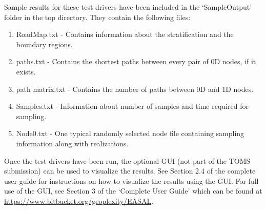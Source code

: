 \documentclass[10pt]{article}
\begin{document}
Sample results for these test drivers have been included in the `SampleOutput'
folder in the top directory.  They contain the following files:
\begin{enumerate}
\item RoadMap.txt - Contains information about the stratification and the
boundary regions.

\item paths.txt - Contains the shortest paths between every pair of 0D nodes,
if it exists.

\item path matrix.txt - Contains the number of paths between 0D and 1D nodes.

\item Samples.txt - Information about number of samples and time required for
sampling.

\item Node0.txt - One typical randomly selected node file containing sampling
information along with realizations.

\end{enumerate}

Once the test drivers have been run, the optional GUI (not part of the TOMS
submission) can be used to visualize the results.  See Section 2.4 of the
complete user guide for instructions on how to visualize the results using the
GUI.  For full use of the GUI, see Section 3 of the `Complete User Guide' which
can be found at \url{https://www.bitbucket.org/geoplexity/EASAL}.  











\end{document}
